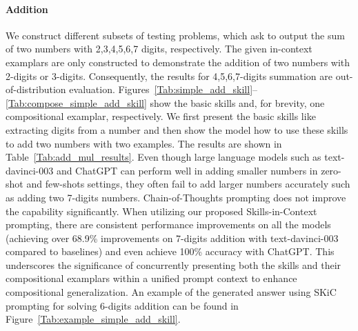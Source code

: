\paragraph{Addition} We construct different subsets of testing problems, which ask to output the sum of two numbers with 2,3,4,5,6,7 digits, respectively. The given in-context examplars are only constructed to demonstrate the addition of two numbers with 2-digits or 3-digits. Consequently, the results for 4,5,6,7-digits summation are out-of-distribution evaluation. Figures~\ref{Tab:simple_add_skill}--\ref{Tab:compose_simple_add_skill} show the basic skills and, for brevity, one compositional examplar, respectively. We first present the basic skills like extracting digits from a number and then show the model how to use these skills to add two numbers with two examples. The results are shown in Table~\ref{Tab:add_mul_results}. Even though large language models such as text-davinci-003 and ChatGPT can perform well in adding smaller numbers in zero-shot and few-shots settings, they often fail to add larger numbers accurately such as adding two 7-digits numbers. Chain-of-Thoughts prompting does not improve the capability significantly. When utilizing our proposed Skills-in-Context prompting, there are consistent performance improvements on all the models (achieving over 68.9\% improvements on 7-digits addition with text-davinci-003 compared to baselines) and even achieve 100\% accuracy with ChatGPT. This underscores the significance of concurrently presenting both the skills and their compositional examplars within a unified prompt context to enhance compositional generalization. An example of the generated answer using SKiC prompting for solving 6-digits addition can be found in Figure~\ref{Tab:example_simple_add_skill}.




